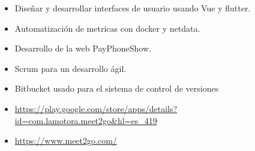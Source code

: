\documentclass[10pt,a4paper,ragged2e]{altacv}
\begin{document}

\begin{fullwidth}
\makecvheader
\end{fullwidth}




\begin{itemize}
    \item Diseñar y desarrollar interfaces de usuario usando Vue y flutter.
    \item Automatización de metricas con docker y netdata.
    \item Desarrollo de la web PayPhoneShow.
    \item Scrum para un desarrollo ágil.
    \item Bitbucket usado para el sistema de control de versiones
    \item \url{https://play.google.com/store/apps/details?id=com.lamotora.meet2go&hl=es_419}
    \item \url{https://www.meet2go.com/}
    
\end{itemize}
\vspace{10px}
\end{document}
